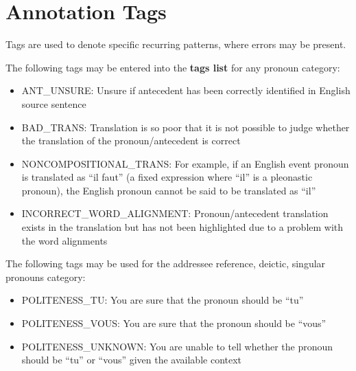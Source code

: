 \documentclass[11pt]{article} %
\begin{document}
\section{Annotation Tags}
\label{Tags}
Tags are used to denote specific recurring patterns, where errors may be present.

The following tags may be entered into the \textbf{tags list} for any pronoun category:

\begin{itemize}
  \item ANT\_UNSURE: Unsure if antecedent has been correctly identified in English source sentence
  \item BAD\_TRANS: Translation is so poor that it is not possible to judge whether the translation of the pronoun/antecedent is correct
  \item NONCOMPOSITIONAL\_TRANS: For example, if an English event pronoun is translated as ``il faut'' (a fixed expression where ``il'' is a pleonastic pronoun), the English pronoun cannot be said to be translated as ``il''
  \item INCORRECT\_WORD\_ALIGNMENT: Pronoun/antecedent translation exists in the translation but has not been highlighted due to a problem with the word alignments
\end{itemize}  

The following tags may be used for the addressee reference, deictic, singular pronouns category:

\begin{itemize}  
  \item POLITENESS\_TU: You are sure that the pronoun should be ``tu''
  \item POLITENESS\_VOUS: You are sure that the pronoun should be ``vous''
  \item POLITENESS\_UNKNOWN: You are unable to tell whether the pronoun should be ``tu'' or ``vous'' given the available context
\end{itemize}
\end{document}
